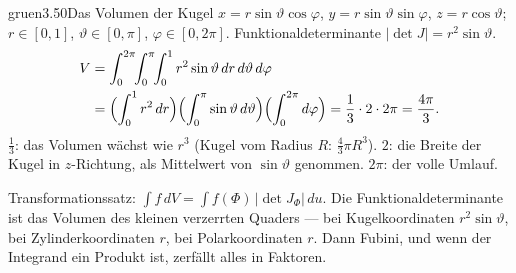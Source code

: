 \begin{loesungkarte}{gruen}{3.50}{Das Volumen der Kugel}
$x = r\sin\vartheta\cos\varphi$, $y = r\sin\vartheta\sin\varphi$, $z = r\cos\vartheta$; $r\in[0, 1]$, $\vartheta\in[0, \pi]$, $\varphi\in[0, 2\pi]$. Funktionaldeterminante $|\det J| = r^{2}\sin\vartheta$.
\begin{align*} V &= \int_0^{2\pi}\!\!\int_0^{\pi}\!\!\int_0^1r^{2}\sin\vartheta\,dr\,d\vartheta\,d\varphi\\ &= \Bigl(\int_0^1r^{2}\,dr\Bigr)\Bigl(\int_0^{\pi}\sin\vartheta\,d\vartheta\Bigr)\Bigl(\int_0^{2\pi}d\varphi\Bigr) = \frac13\cdot2\cdot2\pi = \frac{4\pi}3 . \end{align*}
$\frac13$: das Volumen wächst wie $r^{3}$ (Kugel vom Radius $R$: $\frac43\pi R^{3}$). $2$: die Breite der Kugel in $z$-Richtung, als Mittelwert von $\sin\vartheta$ genommen. $2\pi$: der volle Umlauf.
\begin{mitnehmen}\kastentext
Transformationssatz: $\int f\,dV = \int f(\Phi)\,|\det J_\Phi|\,du$. Die Funktionaldeterminante ist das Volumen des kleinen verzerrten Quaders --- bei Kugelkoordinaten $r^{2}\sin\vartheta$, bei Zylinderkoordinaten $r$, bei Polarkoordinaten $r$. Dann Fubini, und wenn der Integrand ein Produkt ist, zerfällt alles in Faktoren.
\end{mitnehmen}
\end{loesungkarte}
